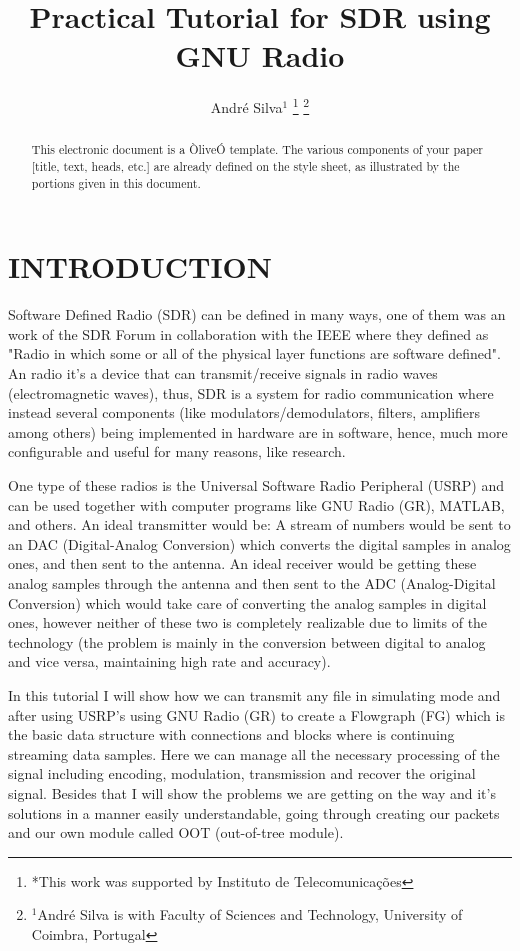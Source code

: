 \documentclass[a4paper, 10pt, conference]{ieeeconf}      %
\title{\LARGE \bf
Practical Tutorial for SDR using GNU Radio
}
\author{André Silva$^{1}$
\thanks{*This work was supported by Instituto de Telecomunicações}%
\thanks{$^{1}$André Silva is with Faculty of Sciences and Technology,
        University of Coimbra, Portugal}
}
\begin{document}
\maketitle
\thispagestyle{empty}
\pagestyle{empty}


\begin{abstract}

This electronic document is a ÒliveÓ template. The various components of your paper [title, text, heads, etc.] are already defined on the style sheet, as illustrated by the portions given in this document.

\end{abstract}

\section{INTRODUCTION}

Software Defined Radio (SDR) can be defined in many ways, one of them was an work of the SDR Forum in collaboration with the IEEE where they defined as "Radio in which some or all of the physical layer functions are software defined". An radio it's a device that can transmit/receive signals in radio waves (electromagnetic waves), thus, SDR is a system for radio communication where instead several components (like modulators/demodulators, filters, amplifiers among others) being implemented in hardware are in software, hence, much more configurable and useful for many reasons, like research. 

One type of these radios is the Universal Software Radio Peripheral (USRP) and can be used together with computer programs like GNU Radio (GR), MATLAB, and others. An ideal transmitter would be: A stream of numbers would be sent to an DAC (Digital-Analog Conversion) which converts the digital samples in analog ones, and then sent to the antenna. An ideal receiver would be getting these
analog samples through the antenna and then sent to the ADC (Analog-Digital Conversion) which would take care of converting the analog samples in digital ones, however neither of these two is completely realizable due to limits of the technology (the problem is mainly in the conversion between digital to analog and vice versa, maintaining high rate and accuracy). 

In this tutorial I will show how we can transmit any file in simulating mode and after using USRP's using GNU Radio (GR) to create a Flowgraph (FG) which is the basic data structure with connections and blocks where is continuing streaming data samples. Here we can manage all the necessary processing of the signal including encoding, modulation, transmission and recover the original signal. Besides that I will show the problems we are getting on the way and it's solutions in a manner easily understandable, going through creating our packets and our own module called OOT (out-of-tree module).
\end{document}
